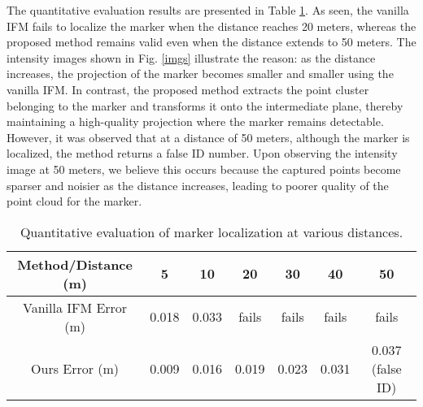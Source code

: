 The quantitative evaluation results are presented in Table \ref{imtab2}. As seen, the vanilla IFM fails to localize the marker when the distance reaches 20 meters, whereas the proposed method remains valid even when the distance extends to 50 meters. The intensity images shown in Fig. \ref{imgs} illustrate the reason: as the distance increases, the projection of the marker becomes smaller and smaller using the vanilla IFM. In contrast, the proposed method extracts the point cluster belonging to the marker and transforms it onto the intermediate plane, thereby maintaining a high-quality projection where the marker remains detectable. However, it was observed that at a distance of 50 meters, although the marker is localized, the method returns a false ID number. Upon observing the intensity image at 50 meters, we believe this occurs because the captured points become sparser and noisier as the distance increases, leading to poorer quality of the point cloud for the marker. \par

\begin{table}[H]
\caption{Quantitative evaluation of marker localization at various distances. }
	\centering
	\begin{center}
		\begin{tabular}{c|c|c|c|c|c|c}
			\hline \hline
				Method/Distance (m) & 5 & 10 & 20 & 30 & 40 & 50 \\ \hline
Vanilla IFM Error (m) & 0.018 & 0.033 & fails & fails & fails & fails \\ \hline
			Ours Error (m) & 0.009 & 0.016 & 0.019 & 0.023 & 0.031 & 0.037 (false ID)  \\ \hline \hline
		\end{tabular}
  \end{center}
		\label{imtab2}
\end{table}
